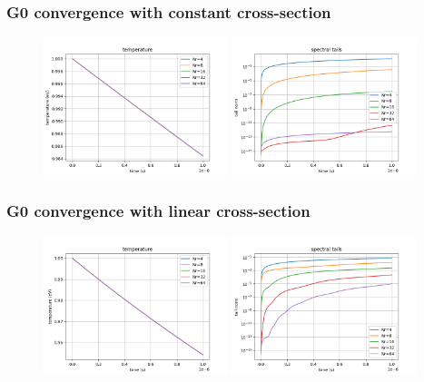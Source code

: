 \documentclass[mathserif, aspectratio=169]{beamer}
\begin{document}
	\begin{frame}
		\frametitle{G0 convergence with constant cross-section}
		\begin{figure}
			\includegraphics[width=0.48\textwidth]{g0_mw_m0_temp.png}
			\includegraphics[width=0.48\textwidth]{g0_mw_m0_tails.png}
		\end{figure}
	\end{frame}


	\begin{frame}
		\frametitle{G0 convergence with linear cross-section}
		\begin{figure}
			\includegraphics[width=0.48\textwidth]{g0_mw_m1_temp.png}
			\includegraphics[width=0.48\textwidth]{g0_mw_m1_tails.png}
		\end{figure}
	\end{frame}
	
\end{document}
